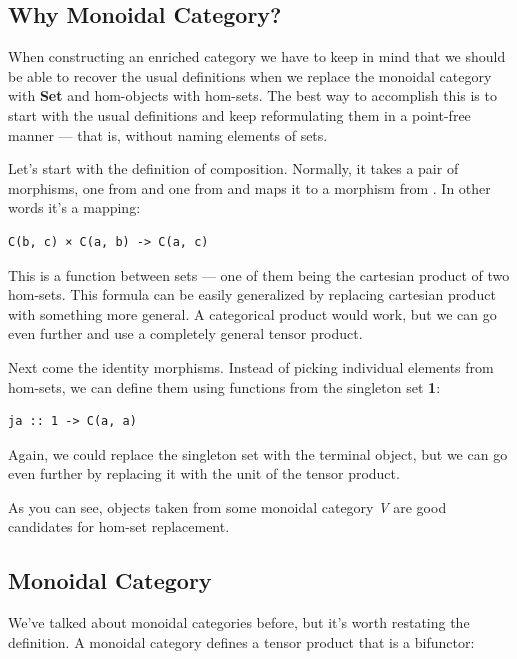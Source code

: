 \subsection{Why Monoidal Category?}\label{why-monoidal-category}

When constructing an enriched category we have to keep in mind that we
should be able to recover the usual definitions when we replace the
monoidal category with \textbf{Set} and hom-objects with hom-sets. The
best way to accomplish this is to start with the usual definitions and
keep reformulating them in a point-free manner --- that is, without
naming elements of sets.

Let's start with the definition of composition. Normally, it takes a
pair of morphisms, one from  and one from
 and maps it to a morphism from . In
other words it's a mapping:

\begin{verbatim}
C(b, c) × C(a, b) -> C(a, c)
\end{verbatim}

This is a function between sets --- one of them being the cartesian
product of two hom-sets. This formula can be easily generalized by
replacing cartesian product with something more general. A categorical
product would work, but we can go even further and use a completely
general tensor product.

Next come the identity morphisms. Instead of picking individual elements
from hom-sets, we can define them using functions from the singleton set
\textbf{1}:

\begin{verbatim}
ja :: 1 -> C(a, a)
\end{verbatim}

Again, we could replace the singleton set with the terminal object, but
we can go even further by replacing it with the unit  of the
tensor product.

As you can see, objects taken from some monoidal category \emph{V} are
good candidates for hom-set replacement.

\subsection{Monoidal Category}\label{monoidal-category}

We've talked about monoidal categories before, but it's worth restating
the definition. A monoidal category defines a tensor product that is a
bifunctor:

